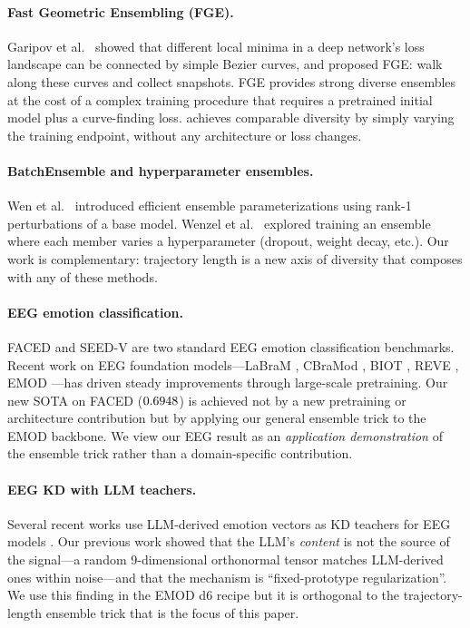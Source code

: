 \paragraph{Fast Geometric Ensembling (FGE).}
Garipov et al.\ \cite{garipov2018loss} showed that different local minima
in a deep network's loss landscape can be connected by simple Bezier
curves, and proposed FGE: walk along these curves and collect snapshots.
FGE provides strong diverse ensembles at the cost of a complex training
procedure that requires a pretrained initial model plus a curve-finding
loss. \ours{} achieves comparable diversity by simply varying the training
endpoint, without any architecture or loss changes.

\paragraph{BatchEnsemble and hyperparameter ensembles.}
Wen et al.\ \cite{wen2020batchensemble} introduced efficient ensemble
parameterizations using rank-1 perturbations of a base model. Wenzel et
al.\ \cite{wenzel2020hyperparameter} explored training an ensemble where
each member varies a hyperparameter (dropout, weight decay, etc.). Our
work is complementary: trajectory length is a new axis of diversity that
composes with any of these methods.

\paragraph{EEG emotion classification.}
FACED \cite{liu2024faced} and SEED-V \cite{zheng2019investigating} are
two standard EEG emotion classification benchmarks. Recent work on EEG
foundation models---LaBraM \cite{jiang2024labram}, CBraMod
\cite{wang2025cbramod}, BIOT \cite{yang2023biot}, REVE
\cite{kostas2025reve}, EMOD \cite{chen2026emod}---has driven steady
improvements through large-scale pretraining. Our new SOTA on FACED
($0.6948$) is achieved not by a new pretraining or architecture
contribution but by applying our general ensemble trick to the EMOD
backbone. We view our EEG result as an \emph{application demonstration}
of the ensemble trick rather than a domain-specific contribution.

\paragraph{EEG KD with LLM teachers.}
Several recent works use LLM-derived emotion vectors as KD teachers for
EEG models \cite{zhang2024emotionkd, li2025emod, aqa2024emotion}. Our
previous work showed that the LLM's \emph{content} is not the source of
the signal---a random 9-dimensional orthonormal tensor matches LLM-derived
ones within noise---and that the mechanism is ``fixed-prototype
regularization''. We use this finding in the EMOD d6 recipe but it is
orthogonal to the trajectory-length ensemble trick that is the focus of
this paper.
